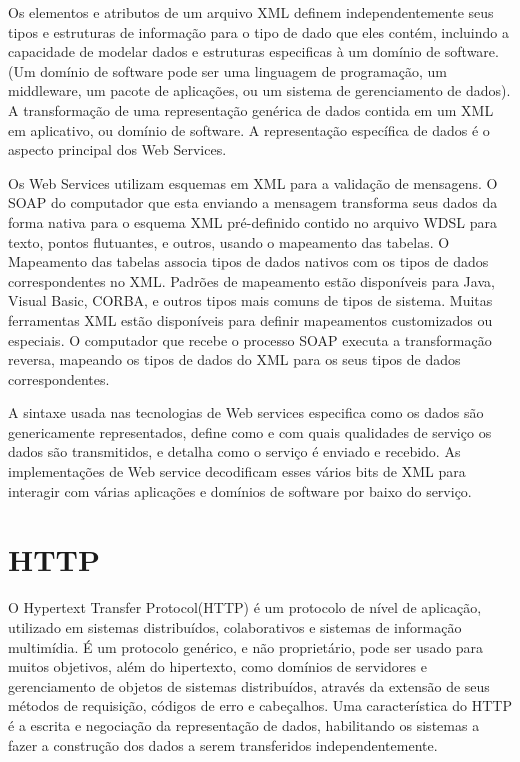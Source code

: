\documentclass{acm_proc_article-sp}
\begin{document}
		Os elementos e atributos de um arquivo XML definem independentemente seus tipos e estruturas de informação para o tipo de dado que eles contém, incluindo a capacidade de modelar dados e estruturas especificas à um domínio de software. (Um domínio de software pode ser uma linguagem de programação, um middleware, um pacote de aplicações, ou um sistema de gerenciamento de dados). A transformação de uma representação genérica de dados contida em um XML em aplicativo, ou domínio de software. A representação específica de dados é o aspecto principal dos Web Services.
		
		Os Web Services utilizam esquemas em XML para a validação de mensagens. O SOAP do computador que esta enviando a mensagem transforma seus dados da forma nativa para o esquema XML pré-definido contido no arquivo WDSL para texto, pontos flutuantes, e outros, usando o mapeamento das tabelas. O Mapeamento das tabelas associa tipos de dados nativos com os tipos de dados correspondentes no XML. Padrões de mapeamento estão disponíveis para Java, Visual Basic, CORBA, e outros tipos mais comuns de tipos de sistema. Muitas ferramentas XML estão disponíveis para definir mapeamentos customizados ou especiais. O computador que recebe o processo SOAP executa a transformação reversa, mapeando os tipos de dados do XML para os seus tipos de dados correspondentes.
		
		A sintaxe usada nas tecnologias de Web services especifica como os dados são genericamente representados, define como e com quais qualidades de serviço os dados são transmitidos, e detalha como o serviço é enviado e recebido. As implementações de Web service decodificam esses vários bits de XML para interagir com várias aplicações e domínios de software por baixo do serviço.\cite{UNDERWEBSERVICES}
		
\section{HTTP}
		O Hypertext Transfer Protocol(HTTP) é um protocolo de nível de aplicação, utilizado em sistemas distribuídos, colaborativos e sistemas de informação multimídia. É um protocolo genérico, e não proprietário, pode ser usado para muitos objetivos, além do hipertexto, como domínios de servidores e gerenciamento de objetos de sistemas distribuídos, através da extensão de seus métodos de requisição, códigos de erro e cabeçalhos. Uma característica do HTTP é a escrita e negociação da representação de dados, habilitando os sistemas a fazer a construção dos dados a serem transferidos independentemente.\cite{HTTP-1.1}
\end{document}
